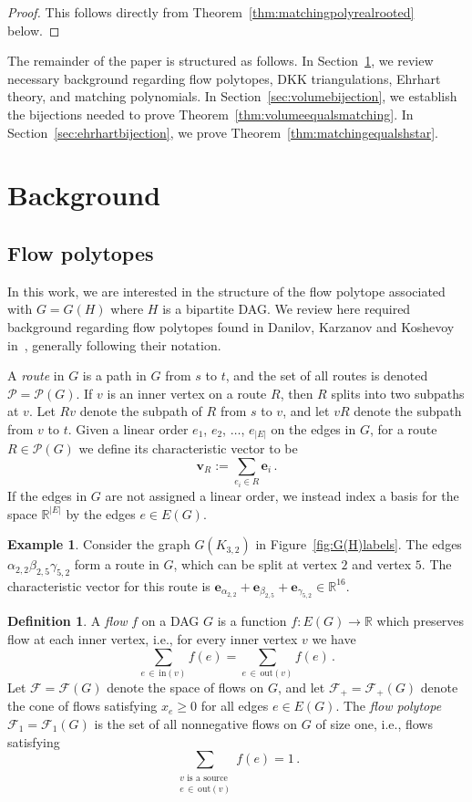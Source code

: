 \documentclass[12pt]{amsart}
\theoremstyle{definition}
\newtheorem{definition}[theorem]{Definition}
\newtheorem{example}[theorem]{Example}
\newcommand\be{\mathbf{e}}
\newcommand\bv{\mathbf{v}}
\newcommand\R{\mathbb{R}}
\newcommand\calF{\mathcal{F}}
\newcommand\calP{\mathcal{P}}
\newcommand{\flow}{f}
\begin{document}
\begin{proof}
    This follows directly from Theorem~\ref{thm:matchingpolyrealrooted} below.
\end{proof}

The remainder of the paper is structured as follows.
In Section~\ref{sec:background}, we review necessary background regarding flow polytopes, DKK triangulations, Ehrhart theory, and matching polynomials.
In Section~\ref{sec:volumebijection}, we establish the bijections needed to prove Theorem~\ref{thm:volumeequalsmatching}.
In Section~\ref{sec:ehrhartbijection}, we prove Theorem~\ref{thm:matchingequalshstar}.

\section{Background}\label{sec:background}

\subsection{Flow polytopes}
In this work, we are interested in the structure of the flow polytope associated with $G=G(H)$ where $H$ is a bipartite DAG.
We review here required background regarding flow polytopes found in Danilov, Karzanov and Koshevoy in~\cite{DKK12}, generally following their notation.

A \emph{route} in $G$ is a path in $G$ from $s$ to $t$, and the set of all routes is denoted $\calP=\calP(G)$. 
If $v$ is an inner vertex on a route $R$, then $R$ splits into two subpaths at $v$. 
Let $Rv$ denote the subpath of $R$ from $s$ to $v$, and let $vR$ denote the subpath from $v$ to $t$. 
Given a linear order $e_1$, $e_2$, $\ldots$, $e_{|E|}$ on the edges in $G$, for a route $R \in \calP(G)$ we define its characteristic vector to be 
\[
\bv_R :=\sum_{e_i\in R} \be_{i} \, .
\]
If the edges in $G$ are not assigned a linear order, we instead index a basis for the space $\R^{|E|}$ by the edges $e\in E(G)$.

\begin{example}
Consider the graph $G(K_{3,2})$ in Figure~\ref{fig:G(H)labels}.
The edges $\alpha_{2,2}\beta_{2,5}\gamma_{5,2}$ form a route in $G$, which can be split at vertex $2$ and vertex $5$.
The characteristic vector for this route is $\be_{\alpha_{2,2}}+\be_{\beta_{2,5}}+\be_{\gamma_{5,2}}\in \R^{16}$.
\end{example}

\begin{definition}\label{def:flow}
A \emph{flow} $\flow$ on a DAG $G$ is a function $\flow: E(G) \to \R$ which preserves flow at each inner vertex, i.e., for every inner vertex $v$ we have
\[
\sum_{e\,\in \, \mathrm{in}(v)} \flow(e) = \sum_{e\,\in \, \mathrm{out}(v)} \flow(e) \, .
\]
Let $\calF = \calF(G)$ denote the space of flows on $G$, and let $\calF_+ = \calF_+(G)$ denote the cone of flows satisfying $x_e\geq 0$ for all edges $e\in E(G)$.
The \emph{flow polytope} $\calF_1 = \calF_1(G)$ is the set of all nonnegative flows on $G$ of size one, i.e., flows satisfying
\[
\sum_{\substack{v \text{ is a source} \\ e \,\in \, \mathrm{out}(v)}} \flow(e) = 1 \, .
\]
\end{definition}
\end{document}

